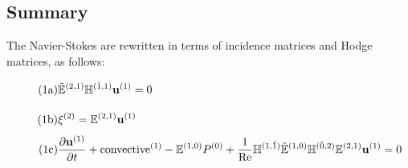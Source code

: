 \subsection{Summary}

The Navier-Stokes are rewritten in terms of incidence matrices and Hodge matrices, as follows:
\begin{align}
    \stepcounter{equation}
    \tag{{\theequation}a}
    &\tilde{\mathbb{E}}^{(2,1)} \mathbb{H}^{(\tilde{1},1)} \mathbf{u}^{(1)} = 0 \vphantom{\frac{\partial^{(1)}}{\partial}} \\
    \tag{{\theequation}b}
    &\xi^{(2)} = \mathbb{E}^{(2,1)} \mathbf{u}^{(1)} \vphantom{\frac{\partial^{(1)}}{\partial}} \\
    \tag{{\theequation}c}
    &\frac{\partial \mathbf{u}^{(1)}}{\partial t} + \text{convective}^{(1)} - \mathbb{E}^{(1,0)} P^{(0)} + \frac{1}{\text{Re}} \mathbb{H}^{(1,\tilde{1})} \tilde{\mathbb{E}}^{(1,0)} \mathbb{H}^{(\tilde{0},2)} \mathbb{E}^{(2,1)} \mathbf{u}^{(1)} = 0
\end{align}
